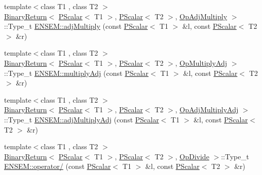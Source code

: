 \begin{DoxyCompactItemize}
\item 
{\footnotesize template$<$class T1 , class T2 $>$ }\\\mbox{\hyperlink{structENSEM_1_1BinaryReturn}{Binary\+Return}}$<$ \mbox{\hyperlink{classENSEM_1_1PScalar}{P\+Scalar}}$<$ T1 $>$, \mbox{\hyperlink{classENSEM_1_1PScalar}{P\+Scalar}}$<$ T2 $>$, \mbox{\hyperlink{structENSEM_1_1OpAdjMultiply}{Op\+Adj\+Multiply}} $>$\+::Type\+\_\+t \mbox{\hyperlink{group__primscalar_gacd01dab554ff851aa1ca0012ec9accf0}{E\+N\+S\+E\+M\+::adj\+Multiply}} (const \mbox{\hyperlink{classENSEM_1_1PScalar}{P\+Scalar}}$<$ T1 $>$ \&l, const \mbox{\hyperlink{classENSEM_1_1PScalar}{P\+Scalar}}$<$ T2 $>$ \&r)
\item 
{\footnotesize template$<$class T1 , class T2 $>$ }\\\mbox{\hyperlink{structENSEM_1_1BinaryReturn}{Binary\+Return}}$<$ \mbox{\hyperlink{classENSEM_1_1PScalar}{P\+Scalar}}$<$ T1 $>$, \mbox{\hyperlink{classENSEM_1_1PScalar}{P\+Scalar}}$<$ T2 $>$, \mbox{\hyperlink{structENSEM_1_1OpMultiplyAdj}{Op\+Multiply\+Adj}} $>$\+::Type\+\_\+t \mbox{\hyperlink{group__primscalar_gabacc9ee173ff2dff79b3faed5f551bfd}{E\+N\+S\+E\+M\+::multiply\+Adj}} (const \mbox{\hyperlink{classENSEM_1_1PScalar}{P\+Scalar}}$<$ T1 $>$ \&l, const \mbox{\hyperlink{classENSEM_1_1PScalar}{P\+Scalar}}$<$ T2 $>$ \&r)
\item 
{\footnotesize template$<$class T1 , class T2 $>$ }\\\mbox{\hyperlink{structENSEM_1_1BinaryReturn}{Binary\+Return}}$<$ \mbox{\hyperlink{classENSEM_1_1PScalar}{P\+Scalar}}$<$ T1 $>$, \mbox{\hyperlink{classENSEM_1_1PScalar}{P\+Scalar}}$<$ T2 $>$, \mbox{\hyperlink{structENSEM_1_1OpAdjMultiplyAdj}{Op\+Adj\+Multiply\+Adj}} $>$\+::Type\+\_\+t \mbox{\hyperlink{group__primscalar_gaefec03134414f1f7c36b09b92cf9570b}{E\+N\+S\+E\+M\+::adj\+Multiply\+Adj}} (const \mbox{\hyperlink{classENSEM_1_1PScalar}{P\+Scalar}}$<$ T1 $>$ \&l, const \mbox{\hyperlink{classENSEM_1_1PScalar}{P\+Scalar}}$<$ T2 $>$ \&r)
\item 
{\footnotesize template$<$class T1 , class T2 $>$ }\\\mbox{\hyperlink{structENSEM_1_1BinaryReturn}{Binary\+Return}}$<$ \mbox{\hyperlink{classENSEM_1_1PScalar}{P\+Scalar}}$<$ T1 $>$, \mbox{\hyperlink{classENSEM_1_1PScalar}{P\+Scalar}}$<$ T2 $>$, \mbox{\hyperlink{structENSEM_1_1OpDivide}{Op\+Divide}} $>$\+::Type\+\_\+t \mbox{\hyperlink{group__primscalar_ga45ba7920db563ad713c3977adc283ede}{E\+N\+S\+E\+M\+::operator/}} (const \mbox{\hyperlink{classENSEM_1_1PScalar}{P\+Scalar}}$<$ T1 $>$ \&l, const \mbox{\hyperlink{classENSEM_1_1PScalar}{P\+Scalar}}$<$ T2 $>$ \&r)

\end{DoxyCompactItemize}
